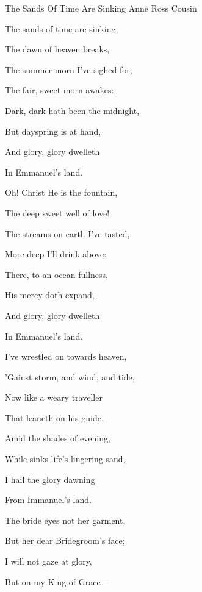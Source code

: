 \documentclass[12pt]{book}
\begin{document}
\begin{song}{The Sands Of Time Are Sinking}{}
  {\SBPubDom}
  {Anne Ross Cousin}
  {}
  {}

  \begin{SBVerse}
    The sands of time are sinking,

    The dawn of heaven breaks,

    The summer morn I've sighed for,

    The fair, sweet morn awakes:

    Dark, dark hath been the midnight,

    But dayspring is at hand,

    And glory, glory dwelleth

    In Emmanuel's land.
  \end{SBVerse}

  \begin{SBVerse}
    Oh! Christ He is the fountain,

    The deep sweet well of love!

    The streams on earth I've tasted,

    More deep I'll drink above:

    There, to an ocean fullness,

    His mercy doth expand,

    And glory, glory dwelleth

    In Emmanuel's land.
  \end{SBVerse}

  \begin{SBVerse}
    I've wrestled on towards heaven,

    'Gainst storm, and wind, and tide,

    Now like a weary traveller

    That leaneth on his guide,

    Amid the shades of evening,

    While sinks life's lingering sand,

    I hail the glory dawning

    From Immanuel's land.
  \end{SBVerse}

  \begin{SBVerse}
    The bride eyes not her garment,

    But her dear Bridegroom's face;

    I will not gaze at glory,

    But on my King of Grace---


\end{SBVerse}
\end{song}
\end{document}
